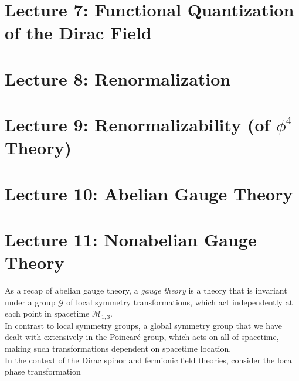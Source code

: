 \documentclass[10pt]{article}
\begin{document}
\section*{Lecture 7: Functional Quantization of the Dirac Field}
\label{sec: lec7}



\clearpage

\section*{Lecture 8: Renormalization}
\label{sec: lec8}



\clearpage

\section*{Lecture 9: Renormalizability (of $\phi^4$ Theory)}
\label{sec: lec9}



\clearpage

\section*{Lecture 10: Abelian Gauge Theory}
\label{sec: lec10}



\clearpage

\section*{Lecture 11: Nonabelian Gauge Theory}
\label{sec: lec11}

\noindent As a recap of abelian gauge theory, a \textit{gauge theory} is a theory that is invariant under a group $\mathcal{G}$ of local symmetry transformations, which act independently at each point in spacetime $\mathcal{M}_{1,3}$. \\

\noindent In contrast to local symmetry groups, a global symmetry group that we have dealt with extensively in the Poincar\'e group, which acts on all of spacetime, making such transformations dependent on spacetime location. \\

\noindent In the context of the Dirac spinor and fermionic field theories, consider the local phase transformation
\end{document}
